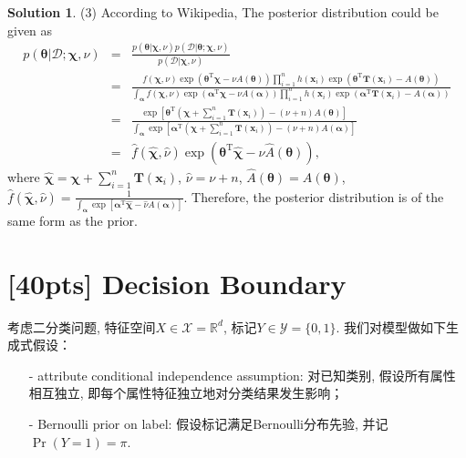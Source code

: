 \documentclass[a4paper,UTF8]{article}
\numberwithin{equation}{section}
\theoremstyle{definition}
\newtheorem*{solution}{Solution}
\begin{document}
\begin{solution}
\item[(3)] According to Wikipedia\cite{ref: conj_dist}, The posterior distribution could be given as
\begin{eqnarray}
p(\bm{\theta}|\mathcal{D}; \bm{\chi}, {\nu})&=&\frac{p(\bm{\theta}|\bm{\chi},\nu)p(\mathcal{D}|\bm{\theta}; \bm{\chi}, {\nu})}{p(\mathcal{D}|\bm\chi, \nu)}\nonumber\\
&=&\frac{f(\bm\chi, \nu)\exp(\bm\theta^\mathrm{T}\bm\chi-\nu A(\bm\theta))\prod_{i=1}^nh(\bm{x}_i)\exp(\bm\theta^\mathrm{T}\bm{T}(\bm{x}_i)-A(\bm{\theta}))}{\int_{\bm\alpha} f(\bm\chi, \nu)\exp(\bm\alpha^\mathrm{T}\bm\chi-\nu A(\bm\alpha))\prod_{i=1}^nh(\bm{x}_i)\exp(\bm\alpha^\mathrm{T}\bm{T}(\bm{x}_i)-A(\bm{\alpha}))}\nonumber\\
&=&\frac{\exp[\bm\theta^\mathrm{T}(\bm\chi+\sum_{i=1}^n\bm{T}(\bm{x}_i))-(\nu+n)A(\bm\theta)]}{\int_{\bm\alpha}{\exp[\bm\alpha^\mathrm{T}(\bm\chi+\sum_{i=1}^n\bm{T}(\bm{x}_i))-(\nu+n)A(\bm\alpha)]}}\nonumber\\
&=&\hat{f}(\bm{\hat{\chi}}, \hat\nu)\exp(\bm\theta^\mathrm{T}\hat{\bm\chi}-\hat\nu \hat A(\bm\theta)),
\end{eqnarray}
where $\hat{\bm\chi}=\bm\chi+\sum_{i=1}^n\bm{T}(\bm{x}_i)$, $\hat\nu=\nu+n$, $\hat A(\bm\theta)=A(\bm\theta)$, $\hat{f}(\bm{\hat{\chi}}, \hat\nu)=\frac{1}{\int_{\bm\alpha}{\exp[\bm\alpha^\mathrm{T}\hat{\bm\chi}-\hat\nu A(\bm\alpha)]}}$. Therefore, the posterior distribution is of the same form as the prior.
~\\
\end{solution}

\section{[40pts] Decision Boundary}
考虑二分类问题, 特征空间$X \in \mathcal{X}= \mathbb{R}^d$, 标记$Y \in \mathcal{Y}= \{0, 1\}$. 我们对模型做如下生成式假设：
\begin{itemize}
\item[-] attribute conditional independence assumption: 对已知类别, 假设所有属性相互独立, 即每个属性特征独立地对分类结果发生影响；
\item[-] Bernoulli prior on label: 假设标记满足Bernoulli分布先验, 并记$\Pr(Y=1) = \pi$. 
\end{itemize}
\end{document}
